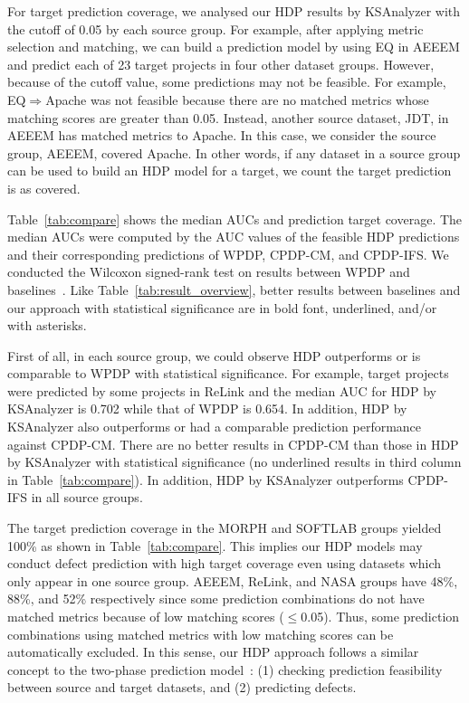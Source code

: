 For target prediction coverage, we analysed our HDP results by KSAnalyzer with
the cutoff of 0.05 by each source group. For example, after applying
metric selection and matching, we can build a prediction model by using EQ in
AEEEM and predict each of 23 target projects in four other dataset
groups. However, because of the cutoff value, some predictions may not be
feasible. For example, EQ$\Rightarrow$Apache was not feasible because there are
no matched metrics whose matching scores are greater than 0.05.
Instead, another source dataset, JDT, in AEEEM has
matched metrics to Apache. In this case, we consider
the source group, AEEEM, covered Apache. In other words, if
any dataset in a source group can be used to build an HDP model for a target, we
count the target prediction is as covered.

Table~\ref{tab:compare} shows the median AUCs and
prediction target coverage. The median AUCs were computed by the AUC
values of the feasible HDP predictions and their corresponding predictions of
WPDP, CPDP-CM, and CPDP-IFS. We conducted the Wilcoxon
signed-rank test on results between WPDP and baselines~\cite{Wilcoxon45}. Like
Table~\ref{tab:result_overview}, better results between baselines and our
approach with statistical significance are in bold font, underlined, and/or with
asterisks.%

First of all, in each source group, we could observe HDP outperforms or is
comparable to WPDP with statistical significance.
For example, target projects were predicted by some projects in ReLink and
the median AUC for HDP by KSAnalyzer is 0.702 while that of
WPDP is 0.654. In addition,
HDP by KSAnalyzer also
outperforms or had a comparable prediction performance against CPDP-CM.
There are no better results in CPDP-CM
than those in HDP by KSAnalyzer with statistical significance (no
underlined results in third column in Table~\ref{tab:compare}). In addition, HDP
by KSAnalyzer outperforms CPDP-IFS in all source groups.

The target prediction coverage in the MORPH and SOFTLAB groups yielded 100\% as
shown in Table~\ref{tab:compare}. This implies our HDP models may conduct defect
prediction with high target coverage even using datasets which only appear in
one source group. AEEEM, ReLink, and NASA groups have 48\%, 88\%, and 52\% respectively
since some prediction combinations do not have matched metrics because of low matching scores ($\leq$0.05).
Thus, some prediction combinations
using matched metrics with low matching scores can be automatically excluded. In
this sense, our HDP approach follows a similar concept to the two-phase
prediction model~\cite{Kim13}: (1) checking prediction feasibility between
source and target datasets, and (2) predicting defects.


